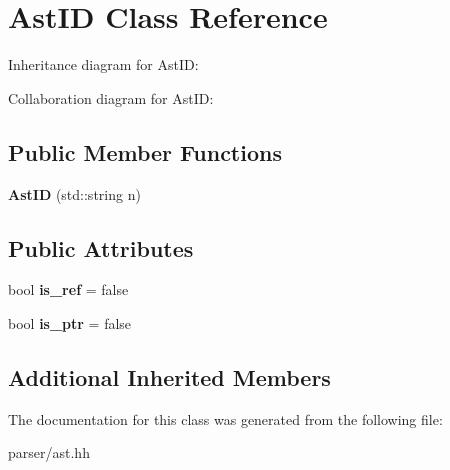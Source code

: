 \hypertarget{classAstID}{}\section{Ast\+ID Class Reference}
\label{classAstID}


Inheritance diagram for Ast\+ID\+:


Collaboration diagram for Ast\+ID\+:
\subsection*{Public Member Functions}
\begin{DoxyCompactItemize}
\item 
\mbox{\label{classAstID_a0a7b4d7e3d055c3838600ad0c91f7dea}} 
{\bfseries Ast\+ID} (std\+::string n)
\end{DoxyCompactItemize}
\subsection*{Public Attributes}
\begin{DoxyCompactItemize}
\item 
\mbox{\label{classAstID_a5a4a743bd3753775ae8ab7d7c5a0bf85}} 
bool {\bfseries is\+\_\+ref} = false
\item 
\mbox{\label{classAstID_a8ee15afa92c97c267d3d70099fa54425}} 
bool {\bfseries is\+\_\+ptr} = false
\end{DoxyCompactItemize}
\subsection*{Additional Inherited Members}


The documentation for this class was generated from the following file\+:\begin{DoxyCompactItemize}
\item 
parser/ast.\+hh\end{DoxyCompactItemize}
